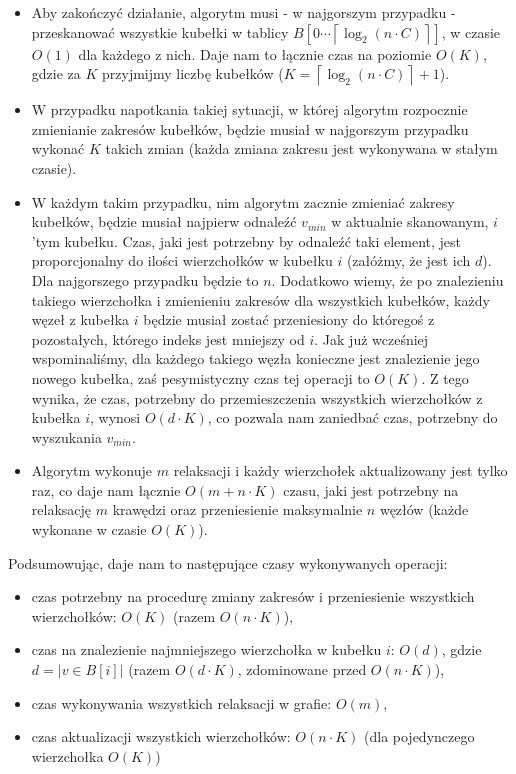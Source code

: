 \begin{itemize}
\item Aby zakończyć działanie, algorytm musi - w najgorszym przypadku - przeskanować wszystkie kubełki w tablicy $B \left[ 0 \cdots \left \lceil \log_{2} \left( n \cdot C \right) \right \rceil \right]$, w czasie $O \left( 1 \right)$ dla każdego z nich. Daje nam to łącznie czas na poziomie $O \left( K \right)$, gdzie za $K$ przyjmijmy liczbę kubełków ($K = \left \lceil \log_{2} \left( n \cdot C \right) \right \rceil + 1$).
\item W przypadku napotkania takiej sytuacji, w której algorytm rozpocznie zmienianie zakresów kubełków, będzie musiał w najgorszym przypadku wykonać $K$ takich zmian (każda zmiana zakresu jest wykonywana w stałym czasie).
\item W każdym takim przypadku, nim algorytm zacznie zmieniać zakresy kubełków, będzie musiał najpierw odnaleźć $v_{min}$ w aktualnie skanowanym, $i$'tym kubełku. Czas, jaki jest potrzebny by odnaleźć taki element, jest proporcjonalny do ilości wierzchołków w kubełku $i$ (załóżmy, że jest ich $d$). Dla najgorszego przypadku będzie to $n$. Dodatkowo wiemy, że po znalezieniu takiego wierzchołka i zmienieniu zakresów dla wszystkich kubełków, każdy węzeł z kubełka $i$ będzie musiał zostać przeniesiony do któregoś z pozostałych, którego indeks jest mniejszy od $i$. Jak już wcześniej wspominaliśmy, dla każdego takiego węzła konieczne jest znalezienie jego nowego kubełka, zaś pesymistyczny czas tej operacji to $O \left( K \right)$. Z tego wynika, że czas, potrzebny do przemieszczenia wszystkich wierzchołków z kubełka $i$, wynosi $ O \left( d \cdot K \right)$, co pozwala nam zaniedbać czas, potrzebny do wyszukania $v_{min}$.
\item Algorytm wykonuje $m$ relaksacji i każdy wierzchołek aktualizowany jest tylko raz, co daje nam łącznie $O \left( m + n \cdot K \right)$ czasu, jaki jest potrzebny na relaksację $m$ krawędzi oraz przeniesienie maksymalnie $n$ węzłów (każde wykonane w czasie $O \left( K\right)$).
\end{itemize}

Podsumowując, daje nam to następujące czasy wykonywanych operacji:

\begin{itemize}
\item czas potrzebny na procedurę zmiany zakresów i przeniesienie wszystkich wierzchołków: $ O \left( K \right)$ (razem $ O \left( n \cdot K \right)$),
\item czas na znalezienie najmniejszego wierzchołka w kubełku $i$: $ O \left( d \right)$, gdzie $d = \left| v \in B \left[ i\right] \right|$ (razem $ O \left( d \cdot K \right)$, zdominowane przed $ O \left( n \cdot K \right)$),
\item czas wykonywania wszystkich relaksacji w grafie: $ O \left( m \right) $,
\item czas aktualizacji wszystkich wierzchołków: $ O \left( n \cdot K \right)$ (dla pojedynczego wierzchołka $O \left( K\right)$)
\end{itemize}


